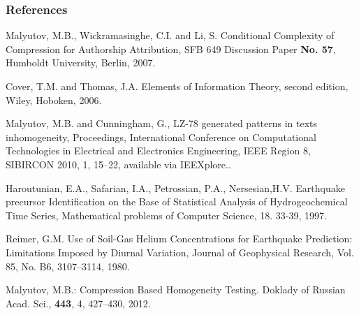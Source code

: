 \documentclass{beamer}
\begin{document}
\begin{frame}
\frametitle{References}
\footnotesize{
\begin{thebibliography}{99} %



 Malyutov, M.B., Wickramasinghe, C.I. and Li, S.  Conditional
Complexity of Compression for Authorship Attribution, SFB 649
Discussion Paper \textbf{No. 57}, Humboldt University, Berlin, 2007.

 Cover, T.M. and Thomas, J.A. Elements of Information Theory, second edition, Wiley, Hoboken, 2006.

 Malyutov, M.B. and Cunningham, G., LZ-78 generated patterns in texts inhomogeneity, Proceedings, International Conference on Computational Technologies in Electrical and Electronics Engineering, IEEE Region 8, SIBIRCON 2010, 1, 15--22, available via IEEXplore..

 Haroutunian, E.A.,  Safarian, I.A.,  Petrossian, P.A., Nersesian,H.V.
Earthquake precursor Identification on the Base of Statistical Analysis of Hydrogeochemical Time Series,
Mathematical problems of Computer Science, 18. 33-39, 1997.

 Reimer, G.M.
Use of Soil-Gas Helium Concentrations for Earthquake Prediction:
Limitations Imposed by Diurnal Variation, Journal  of Geophysical Research,  Vol. 85, No. B6,  3107--3114, 1980.



  Malyutov, M.B.: Compression Based Homogeneity Testing. Doklady of Russian Acad. Sci., {\bf 443}, 4, 427--430, 2012.



\end{thebibliography}
}
\end{frame}
\end{document}
